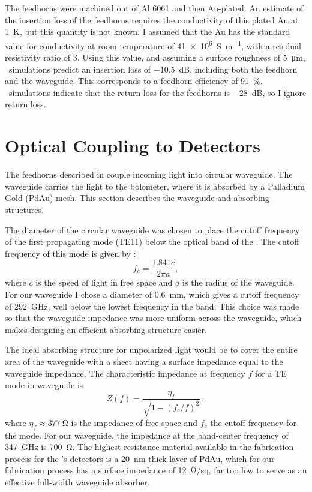 The feedhorns were machined out of Al 6061 and then Au-plated.
An estimate of the insertion loss of the feedhorns requires the conductivity of this plated Au at \SI{1}{\K}, but this quantity is not known.
I assumed that the Au has the standard value for conductivity at room temperature of \SI{41e6}{S\per\m}, with a residual resistivity ratio of 3.
Using this value, and assuming a surface roughness of \SI{5}{\um}, \HFSS\ simulations predict an insertion loss of \SI{-10.5}{\dB}, including both the feedhorn and the waveguide.
This corresponds to a feedhorn efficiency of \SI{91}{\percent}.
\HFSS\ simulations indicate that the return loss for the feedhorns is \SI{-28}{\dB}, so I ignore return loss.

\section{Optical Coupling to Detectors} \label{sec:ch4-coupling}

The feedhorns described in  couple incoming light into circular waveguide.
The waveguide carries the light to the bolometer, where it is absorbed by a Palladium Gold (PdAu) mesh.
This section describes the waveguide and absorbing structures.

The diameter of the circular waveguide was chosen to place the cutoff frequency of the first propagating mode (TE11) below the optical band of the \Imager.
The cutoff frequency of this mode is given by \cite[Chapter~5]{harrington_time-harmonic_2001}:
\begin{equation} \label{eqn:ch4-te11-cutoff}
  f_c = \frac{1.841 c}{2 \pi a },
\end{equation}
where $c$ is the speed of light in free space and $a$ is the radius of the waveguide.
For our waveguide I chose a diameter of \SI{0.6}{\mm}, which gives a cutoff frequency of \SI{292}{\GHz}, well below the lowest frequency in the band.
This choice was made so that the waveguide impedance was more uniform across the waveguide, which makes designing an efficient absorbing structure easier.

The ideal absorbing structure for unpolarized light would be to cover the entire area of the waveguide with a sheet having a surface impedance equal to the waveguide impedance.
The characteristic impedance at frequency $f$ for a TE mode in waveguide is \cite[Chapter~2]{harrington_time-harmonic_2001}
\begin{equation} \label{eqn:ch4-wg-imp}
  Z (f) = \frac{\eta_f}{\sqrt{1 - (f_c/f)^2}}\,,
\end{equation}
where $\eta_f \approx \SI{377}{\ohm}$ is the impedance of free space and $f_c$ the cutoff frequency for the mode.
For our waveguide, the impedance at the band-center frequency of \SI{347}{\GHz} is \SI{700}{\ohm}.
The highest-resistance material available in the fabrication process for the \Imager's detectors is a \SI{20}{\nm} thick layer of PdAu, which for our fabrication process has a surface impedance of \SI{12}{\ohm}/sq, far too low to serve as an effective full-width waveguide absorber.

